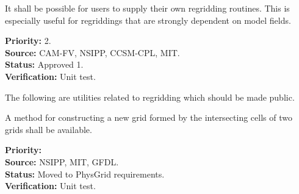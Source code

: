 
It shall be possible for users to supply their own regridding
routines.  This is especially useful for regriddings that are
strongly dependent on model fields.

\begin{reqlist}
{\bf Priority:} 2. \\
{\bf Source:}  CAM-FV, NSIPP, CCSM-CPL, MIT. \\
{\bf Status:} Approved 1. \\
{\bf Verification:} Unit test. 
\end{reqlist}


The following are utilities related to regridding which should be made
public.


A method for constructing a new grid formed by the intersecting
cells of two grids shall be available.

\begin{reqlist}
{\bf Priority:}  \\
{\bf Source:}  NSIPP, MIT, GFDL. \\
{\bf Status:} Moved to PhysGrid requirements. \\
{\bf Verification:} Unit test. 
\end{reqlist}

